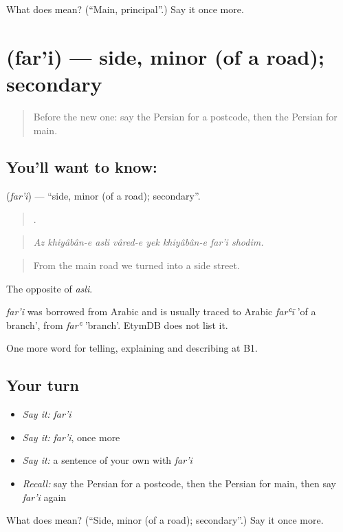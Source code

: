\begin{tcolorbox}[breakable,colback=teal!4,colframe=teal!35!black,title={Before you move on}]
What does  mean? (\textquotedblleft{}Main, principal\textquotedblright{}.) Say it once more.
\end{tcolorbox}
\section[\texorpdfstring{\fa{فرعی} (far'i)}{فرعی (far'i)}]{ (far'i) — side, minor (of a road); secondary}

\label{lesson:FA-C447-fari}



\begin{quote}
Before the new one: say the Persian for a postcode, then the Persian for main.
\end{quote}

\subsection*{You'll want to know: }
\textbf{} (\emph{far'i}) — \textquotedblleft{}side, minor (of a road); secondary\textquotedblright{}.

\begin{quote}
       .
\end{quote}

\begin{quote}
\emph{Az khiyâbân-e asli vâred-e yek khiyâbân-e far'i shodim.}
\end{quote}

\begin{quote}
From the main road we turned into a side street.
\end{quote}

The opposite of \emph{asli}.

\begin{cousinweb}
\emph{far'i} was borrowed from Arabic and is usually traced to Arabic \emph{farʿī} 'of a branch', from \emph{farʿ} 'branch'. EtymDB does not list it.
\end{cousinweb}

\begin{grammarlens}[title={What you've built}]
One more word for telling, explaining and describing at B1.
\end{grammarlens}

\subsection*{Your turn}
\begin{itemize}
\raggedright
  \item \emph{Say it:} \emph{far'i}
  \item \emph{Say it:} \emph{far'i}, once more
  \item \emph{Say it:} a sentence of your own with \emph{far'i}
  \item \emph{Recall:} say the Persian for a postcode, then the Persian for main, then say \emph{far'i} again
\end{itemize}

\begin{tcolorbox}[breakable,colback=teal!4,colframe=teal!35!black,title={Before you move on}]
What does  mean? (\textquotedblleft{}Side, minor (of a road); secondary\textquotedblright{}.) Say it once more.
\end{tcolorbox}
